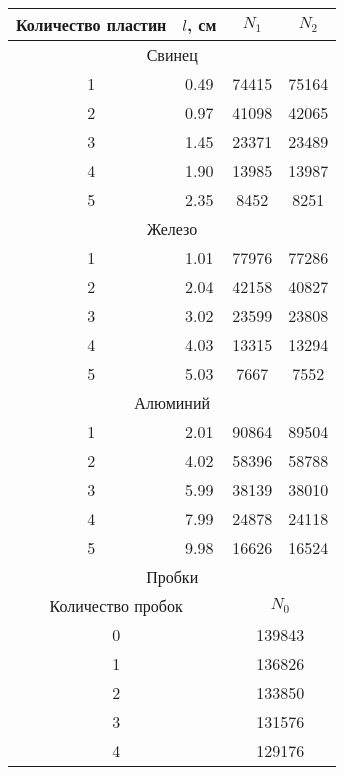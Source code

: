 \begin{tabular}{cccc}
\toprule
Количество пластин & $l$, см & $N_1$ & $N_2$ \\
\midrule
\multicolumn{4}{c}{Свинец} \\
\midrule
1 & 0.49 & 74415 & 75164 \\
2 & 0.97 & 41098 & 42065 \\
3 & 1.45 & 23371 & 23489 \\
4 & 1.90 & 13985 & 13987 \\
5 & 2.35 & 8452  & 8251  \\
\midrule
\multicolumn{4}{c}{Железо} \\
\midrule
1 & 1.01 & 77976 & 77286 \\
2 & 2.04 & 42158 & 40827 \\
3 & 3.02 & 23599 & 23808 \\
4 & 4.03 & 13315 & 13294 \\
5 & 5.03 & 7667  & 7552  \\
\midrule
\multicolumn{4}{c}{Алюминий} \\
\midrule
1 & 2.01 & 90864 & 89504 \\
2 & 4.02 & 58396 & 58788 \\
3 & 5.99 & 38139 & 38010 \\
4 & 7.99 & 24878 & 24118 \\
5 & 9.98 & 16626 & 16524 \\
\midrule
\multicolumn{4}{c}{Пробки} \\
\midrule
\multicolumn{2}{c}{Количество пробок} & \multicolumn{2}{c}{$N_0$} \\
\midrule
\multicolumn{2}{c}{0} & \multicolumn{2}{c}{139843} \\
\multicolumn{2}{c}{1} & \multicolumn{2}{c}{136826} \\
\multicolumn{2}{c}{2} & \multicolumn{2}{c}{133850} \\
\multicolumn{2}{c}{3} & \multicolumn{2}{c}{131576} \\
\multicolumn{2}{c}{4} & \multicolumn{2}{c}{129176} \\
\bottomrule
\end{tabular}
